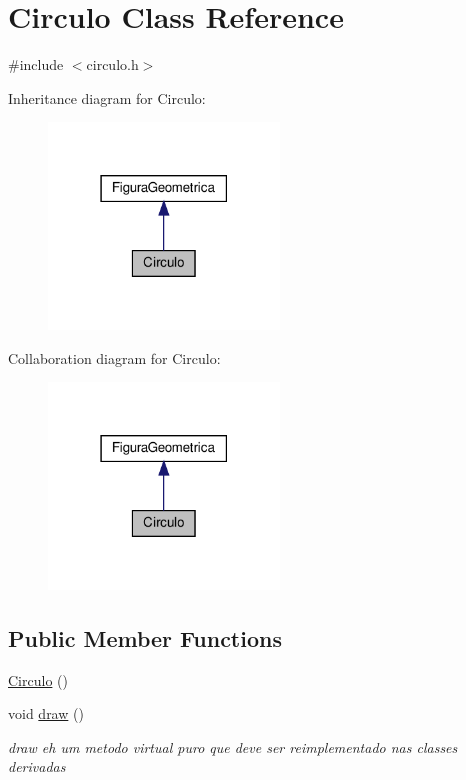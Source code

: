 \hypertarget{class_circulo}{}\section{Circulo Class Reference}
\label{class_circulo}


{\ttfamily \#include $<$circulo.\+h$>$}



Inheritance diagram for Circulo\+:\nopagebreak
\begin{figure}[H]
\begin{center}
\leavevmode
\includegraphics[width=174pt]{class_circulo__inherit__graph}
\end{center}
\end{figure}


Collaboration diagram for Circulo\+:\nopagebreak
\begin{figure}[H]
\begin{center}
\leavevmode
\includegraphics[width=174pt]{class_circulo__coll__graph}
\end{center}
\end{figure}
\subsection*{Public Member Functions}
\begin{DoxyCompactItemize}
\item 
\hyperlink{class_circulo_a6933bf908b78a4167684081a3a8f257f}{Circulo} ()
\item 
void \hyperlink{class_circulo_aa94899872fb6c586d1343df1d9ce0d86}{draw} ()
\begin{DoxyCompactList}\small\item\em draw eh um metodo virtual puro que deve ser reimplementado nas classes derivadas \end{DoxyCompactList}\end{DoxyCompactItemize}



